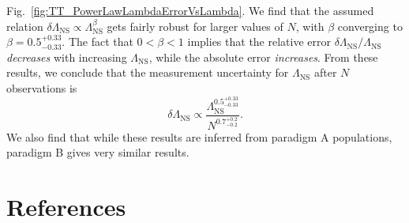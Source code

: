 \documentclass[aps,prd,amsmath,floats,floatfix, twocolumn,
superscriptaddress,nofootinbib,showpacs]{revtex4-1}
\newcommand{\lambdans}{\Lambda_\mathrm{NS}}
\begin{document}
\begin{appendix}
Fig.~\ref{fig:TT_PowerLawLambdaErrorVsLambda}. We find that the assumed
relation $\delta\lambdans\propto\lambdans^\beta$ gets fairly robust for 
larger values of $N$, with $\beta$ converging to $\beta=0.5^{+0.33}_{-0.33}$.
The fact that $0<\beta<1$ implies that the relative error
$\delta\lambdans/\lambdans$ {\it decreases} with increasing $\lambdans$, while
the absolute error {\it increases}.
% 
From these results, we conclude that the measurement uncertainty for
$\lambdans$ after $N$ observations is
\begin{equation}
 \delta\lambdans\propto \dfrac{\lambdans^{0.5^{+0.33}_{-0.33}}}{N^{0.7_{-0.2}^{+0.2}}}.
\end{equation}
We also find that while these results are inferred from paradigm A populations,
paradigm B gives very similar results.


\end{appendix}




\section*{References}

\end{document}
